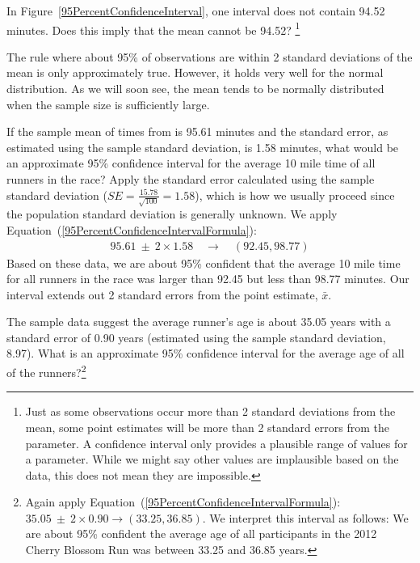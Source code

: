 \begin{exercise}
In Figure~\ref{95PercentConfidenceInterval}, one interval does not contain 94.52 minutes. Does this imply that the mean cannot be 94.52? \footnote{Just as some observations occur more than 2 standard deviations from the mean, some point estimates will be more than 2 standard errors from the parameter. A confidence interval only provides a plausible range of values for a parameter. While we might say other values are implausible based on the data, this does not mean they are impossible.}
\end{exercise}

The rule where about 95\% of observations are within 2 standard deviations of the mean is only approximately true. However, it holds very well for the normal distribution. As we will soon see, the mean tends to be normally distributed when the sample size is sufficiently large. 

\begin{example}{If the sample mean of times from  is 95.61 minutes and the standard error, as estimated using the sample standard deviation, is 1.58 minutes, what would be an approximate 95\% confidence interval for the average 10 mile time of all runners in the race? Apply the standard error calculated using the sample standard deviation ($SE=\frac{15.78}{\sqrt{100}} = 1.58$), which is how we usually proceed since the population standard deviation is generally unknown.}
We apply Equation~(\ref{95PercentConfidenceIntervalFormula}):
\begin{eqnarray*}
95.61\ \pm\ 2 \times  1.58 \quad \rightarrow \quad (92.45, 98.77)
\end{eqnarray*}
Based on these data, we are about 95\% confident that the average 10 mile time for all runners in the race was larger than 92.45 but less than 98.77 minutes. Our interval extends out 2 standard errors from the point estimate, $\bar{x}$.
\end{example}

\begin{exercise} \label{95CIExerciseForAgeOfRun10Samp1}
The sample data suggest the average runner's age is about 35.05 years with a standard error of 0.90 years (estimated using the sample standard deviation, 8.97). What is an approximate 95\% confidence interval for the average age of all of the runners?\footnote{Again apply Equation~(\ref{95PercentConfidenceIntervalFormula}): $35.05 \ \pm \ 2\times 0.90 \rightarrow (33.25, 36.85)$. We interpret this interval as follows: We are about 95\% confident the average age of all participants in the 2012 Cherry Blossom Run was between 33.25 and 36.85 years.}
\end{exercise}

